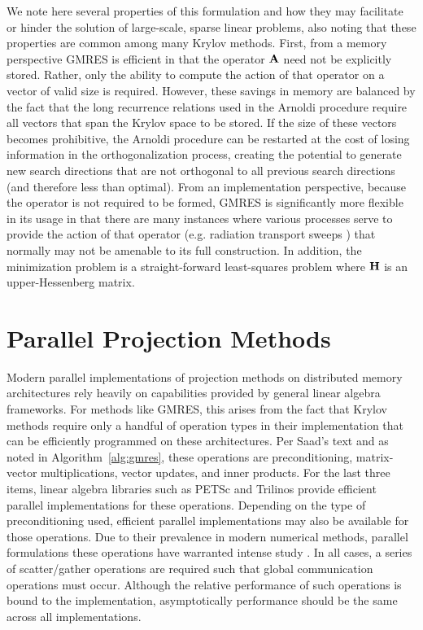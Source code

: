 We note here several properties of this formulation and how they may
facilitate or hinder the solution of large-scale, sparse linear
problems, also noting that these properties are common among many
Krylov methods. First, from a memory perspective GMRES is efficient in
that the operator $\mathbf{A}$ need not be explicitly stored. Rather, only
the ability to compute the action of that operator on a vector of
valid size is required. However, these savings in memory are balanced
by the fact that the long recurrence relations used in the Arnoldi
procedure require all vectors that span the Krylov space to be
stored. If the size of these vectors becomes prohibitive, the Arnoldi
procedure can be restarted at the cost of losing information in the
orthogonalization process, creating the potential to generate new
search directions that are not orthogonal to all previous search
directions (and therefore less than optimal). From an implementation
perspective, because the operator is not required to be formed, GMRES
is significantly more flexible in its usage in that there are many
instances where various processes serve to provide the action of that
operator (e.g. radiation transport sweeps \citep{evans_denovo:_2010})
that normally may not be amenable to its full construction. In
addition, the minimization problem is a straight-forward least-squares
problem where $\mathbf{H}$ is an upper-Hessenberg matrix.

\section{Parallel Projection Methods}
\label{sec:parallel_krylov_methods}
Modern parallel implementations of projection methods on distributed
memory architectures rely heavily on capabilities provided by general
linear algebra frameworks. For methods like GMRES, this arises from
the fact that Krylov methods require only a handful of operation types
in their implementation that can be efficiently programmed on these
architectures. Per Saad's text \citep{saad_iterative_2003} and as
noted in Algorithm~\ref{alg:gmres}, these operations are
preconditioning, matrix-vector multiplications, vector updates, and
inner products. For the last three items, linear algebra libraries
such as PETSc \citep{gropp_scalable_1993} and Trilinos
\citep{heroux_overview_2005} provide efficient parallel
implementations for these operations. Depending on the type of
preconditioning used, efficient parallel implementations may also be
available for those operations. Due to their prevalence in modern
numerical methods, parallel formulations these operations have
warranted intense study \citep{tuminaro_parallel_1998}. In all cases, a series
of scatter/gather operations are required such that global
communication operations must occur. Although the relative performance
of such operations is bound to the implementation, asymptotically
performance should be the same across all implementations.

